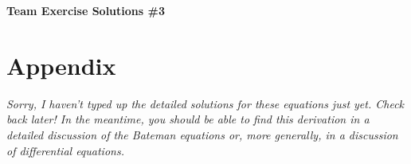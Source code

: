 \documentclass{report}
\begin{document}
\thispagestyle{FirstPage}
\begin{center}
\textbf{\large Team Exercise Solutions \#3}
\end{center}



\newpage



\newpage

\section*{Appendix}

\textit{Sorry, I haven't typed up the detailed solutions for these equations just yet. Check back later! In the meantime, you should be able to find this derivation in a detailed discussion of the Bateman equations or, more generally, in a discussion of differential equations.}
\end{document}

